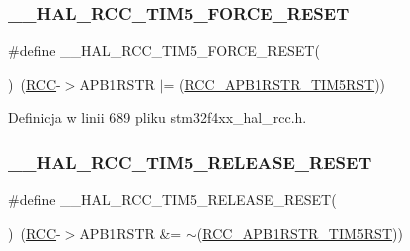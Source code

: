 \subsubsection{\texorpdfstring{\+\_\+\+\_\+\+H\+A\+L\+\_\+\+R\+C\+C\+\_\+\+T\+I\+M5\+\_\+\+F\+O\+R\+C\+E\+\_\+\+R\+E\+S\+ET}{\_\_HAL\_RCC\_TIM5\_FORCE\_RESET}}
{\footnotesize\ttfamily \#define \+\_\+\+\_\+\+H\+A\+L\+\_\+\+R\+C\+C\+\_\+\+T\+I\+M5\+\_\+\+F\+O\+R\+C\+E\+\_\+\+R\+E\+S\+ET(\begin{DoxyParamCaption}{ }\end{DoxyParamCaption})~(\hyperlink{group___peripheral__declaration_ga74944438a086975793d26ae48d5882d4}{R\+CC}-\/$>$A\+P\+B1\+R\+S\+TR $\vert$= (\hyperlink{group___peripheral___registers___bits___definition_ga1d1233dd5266ba55d9951e3b1a334552}{R\+C\+C\+\_\+\+A\+P\+B1\+R\+S\+T\+R\+\_\+\+T\+I\+M5\+R\+ST}))}



Definicja w linii 689 pliku stm32f4xx\+\_\+hal\+\_\+rcc.\+h.

\mbox{\label{group___r_c_c___a_p_b1___force___release___reset_gaf7e0cde5ea8f6425d87ebf2d91e8b360}} 
\subsubsection{\texorpdfstring{\+\_\+\+\_\+\+H\+A\+L\+\_\+\+R\+C\+C\+\_\+\+T\+I\+M5\+\_\+\+R\+E\+L\+E\+A\+S\+E\+\_\+\+R\+E\+S\+ET}{\_\_HAL\_RCC\_TIM5\_RELEASE\_RESET}}
{\footnotesize\ttfamily \#define \+\_\+\+\_\+\+H\+A\+L\+\_\+\+R\+C\+C\+\_\+\+T\+I\+M5\+\_\+\+R\+E\+L\+E\+A\+S\+E\+\_\+\+R\+E\+S\+ET(\begin{DoxyParamCaption}{ }\end{DoxyParamCaption})~(\hyperlink{group___peripheral__declaration_ga74944438a086975793d26ae48d5882d4}{R\+CC}-\/$>$A\+P\+B1\+R\+S\+TR \&= $\sim$(\hyperlink{group___peripheral___registers___bits___definition_ga1d1233dd5266ba55d9951e3b1a334552}{R\+C\+C\+\_\+\+A\+P\+B1\+R\+S\+T\+R\+\_\+\+T\+I\+M5\+R\+ST}))}



